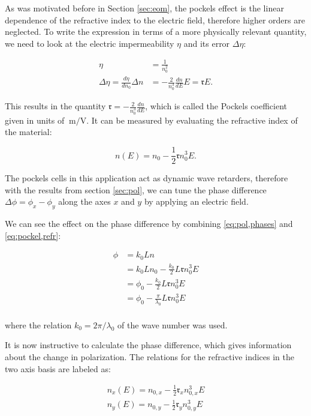As was motivated before in Section \ref{sec:eom}, the pockels effect is the linear dependence of the refractive index to the electric field, therefore higher orders are neglected. To write the expression in terms of a more physically relevant quantity, we need to look at the electric impermeability $\eta$ and its error $\Delta \eta$:

\begin{align}
	\eta & = \frac{1}{n_0^2} \\
	\Delta \eta = \frac{d \eta}{dn_0} \Delta n & = -\frac{2}{n_0^3} \frac{dn}{dE} E = \mathfrak{r} E .
\end{align}
\label{eq:pockel,refr}

This results in the quantity $\mathfrak{r} = -\frac{2}{n_0^3} \frac{dn}{dE}$, which is called the Pockels coefficient given in units of $\SI{}{\meter\per\volt}$. It can be measured by evaluating the refractive index of the material:

\begin{equation}
	n(E) = n_0 - \frac{1}{2} \mathfrak{r} n_0^3 E .
\end{equation}

The pockels cells in this application act as dynamic wave retarders, therefore with the results from section \ref{sec:pol}, we can tune the phase difference $\Delta \phi = \phi_x - \phi_y$ along the axes $x$ and $y$ by applying an electric field.

We can see the effect on the phase difference by combining \ref{eq:pol,phases} and \ref{eq:pockel,refr}:

\begin{align}
	\phi & = k_0 L n \\
		 & = k_0 L n_0 - \frac{k_0}{2} L \mathfrak{r} n_0^3 E \\
		 & = \phi_0 - \frac{k_0}{2} L \mathfrak{r} n_0^3 E \\
		 & = \phi_0 - \frac{\pi}{\lambda_0} L \mathfrak{r} n_0^3 E \\
\end{align}

where the relation $k_0 = 2 \pi / \lambda_0$ of the wave number was used.

It is now instructive to calculate the phase difference, which gives information about the change in polarization. The relations for the refractive indices in the two axis basis are labeled as:

\begin{align}
	n_x(E) = n_{0,x} - \frac{1}{2} \mathfrak{r}_x n_{0,x}^3 E \\
	n_y(E) = n_{0,y} - \frac{1}{2} \mathfrak{r}_y n_{0,y}^3 E
\end{align}

